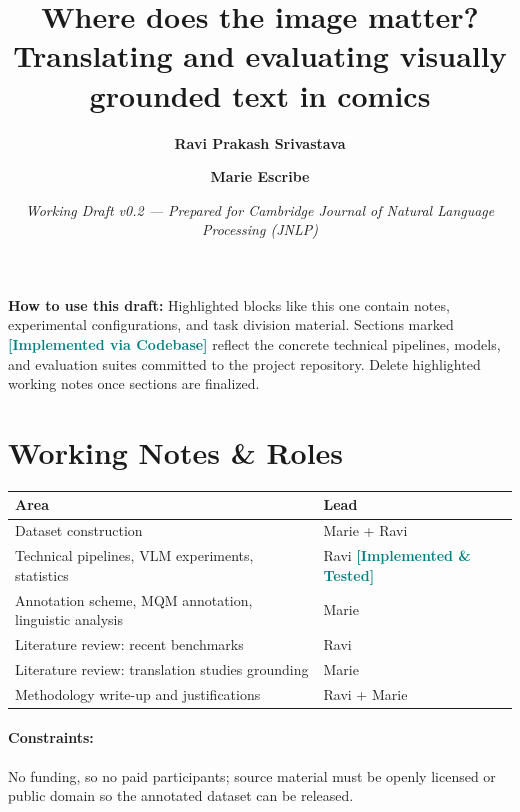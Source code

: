 \documentclass[11pt,a4paper]{article}
\title{\textbf{Where does the image matter? Translating and evaluating visually grounded text in comics}}
\author{\textbf{Ravi Prakash Srivastava} \and \textbf{Marie Escribe}}
\date{\textit{Working Draft v0.2 --- Prepared for Cambridge Journal of Natural Language Processing (JNLP)}}
\begin{document}
\maketitle

\begin{workingnote}
\textbf{How to use this draft:} Highlighted blocks like this one contain notes, experimental configurations, and task division material. Sections marked \textcolor{teal}{\textbf{[Implemented via Codebase]}} reflect the concrete technical pipelines, models, and evaluation suites committed to the project repository. Delete highlighted working notes once sections are finalized.
\end{workingnote}

\section*{Working Notes \& Roles}

\begin{table}[h!]
\centering
\small
\begin{tabularx}{\textwidth}{lX}
\toprule
\textbf{Area} & \textbf{Lead} \\
\midrule
Dataset construction & Marie + Ravi \\
Technical pipelines, VLM experiments, statistics & Ravi \textcolor{teal}{\textbf{[Implemented \& Tested]}} \\
Annotation scheme, MQM annotation, linguistic analysis & Marie \\
Literature review: recent benchmarks & Ravi \\
Literature review: translation studies grounding & Marie \\
Methodology write-up and justifications & Ravi + Marie \\
\bottomrule
\end{tabularx}
\end{table}

\paragraph{Constraints:} No funding, so no paid participants; source material must be openly licensed or public domain so the annotated dataset can be released.
\end{document}
